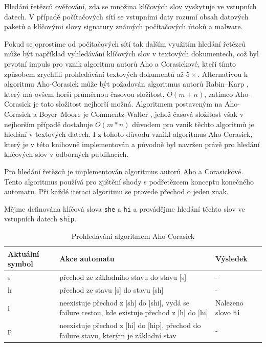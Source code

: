 Hledání řetězců ověřování, zda se množina klíčových slov vyskytuje ve vstupních datech.
V případě počítačových sítí se vstupními daty rozumí obsah datových paketů a klíčovými slovy
signatury známých počítačových útoků a malware.

Pokud se oprostíme od počítačových sítí tak dalším využitím hledání řetězců může být například
vyhledávání klíčových slov v textových dokumentech, což byl prvotní impuls pro vznik
algoritmu autorů Aho a Corasickové, kteří tímto způsobem zrychlili prohledávání
textových dokumentů až $5\times$. Alternativou k algoritmu Aho-Corasick může být požadován
algoritmus autorů Rabin–Karp \cite{rabin-karp}, který má ovšem horší průměrnou časovou složitost, $O(m+n)$,
zatímco Aho-Corasick je tato složitost nejhorší možná. Algoritmem postaveným na Aho-Corasick
a Boyer–Moore \cite{boyer-moore}
je Commentz-Walter \cite{walter}, jehož časová složitost však v nejhorším případě dostahuje $O(m*n)$
důvodem pro vznik těchto algoritmů je hledání v textových datech. I z tohoto důvodu vznikl
algoritmus Aho-Corasick, který je v této knihovně implementován a původně byl navržen
právě pro hledání klíčových slov v odborných publikacích.

Pro hledání řetězců je implementován algoritmus autorů Aho a Corasickové. Tento algoritmus používá pro zjištění shody s podřetězcem konceptu konečného automatu. Při každé iteraci algoritmu se provede přechod o jeden znak.


Mějme definována klíčová slova \texttt{she} a \texttt{hi} a provádějme hledání těchto slov ve vstupních
datech \texttt{ship}.

\begin{table}[!htbp]
	\center
	\label{tab:pm-paper}
    \begin{tabular}{|l|p{8cm}|l|}
    \hline
    Aktuální symbol & Akce automatu & Výsledek \\ \hline
    s & přechod ze základního stavu do stavu [s] & - \\ \hline
    h & přechod ze stavu [s] do stavu [sh] & - \\ \hline
    i & neexistuje přechod z [sh] do [shi],
    vydá se failure cestou,
    kde existuje přechod z [h] do [hi] & Nalezeno slovo \texttt{hi} \\ \hline
    p & neexistuje přechod z [hi] do [hip],
    přechod do failure stavu,
    kterým je základní stav & - \\ \hline
    \end{tabular}
	\caption{Prohledávání algoritmem Aho-Corasick}
\end{table}


